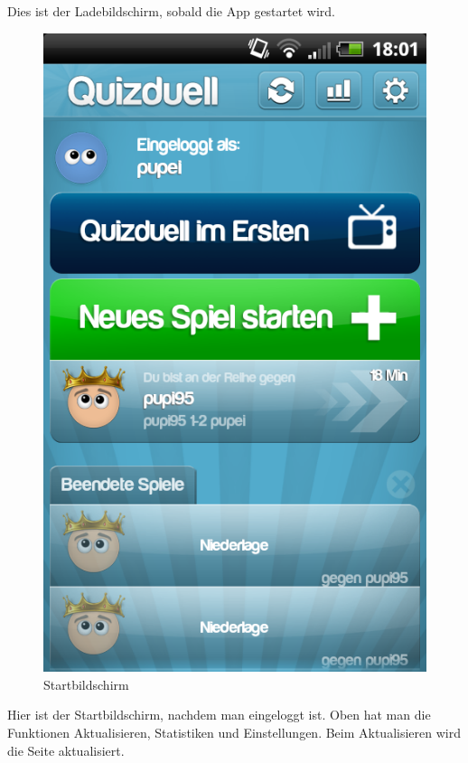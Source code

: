 \documentclass[fontsize=12pt,paper=a4,twoside]{scrartcl}
\begin{document}
Dies ist der Ladebildschirm, sobald die App gestartet wird.

\begin{figure}[H]
\centering
\includegraphics[scale=0.5]{Bilder/start.png}
\caption{Startbildschirm}
\end{figure}

Hier ist der Startbildschirm, nachdem man eingeloggt ist. Oben hat man die Funktionen Aktualisieren, Statistiken und Einstellungen. Beim Aktualisieren wird die Seite aktualisiert. \\
\end{document}
